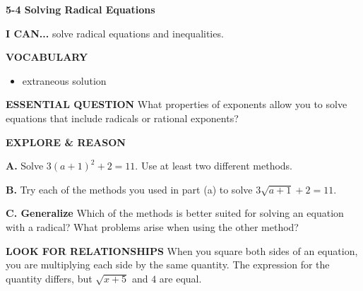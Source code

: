 \documentclass{article}
\newenvironment{lesson-meta}{}{}
\newenvironment{item-analysis}{}{}
\newenvironment{model-discuss}{}{}
\newenvironment{concept-box}{}{}
\begin{document}
\begin{lesson-meta}
\textbf{5-4 Solving Radical Equations}

\textbf{I CAN...} solve radical equations and inequalities.

\textbf{VOCABULARY}
\begin{itemize}
    \item extraneous solution
\end{itemize}

\textbf{ESSENTIAL QUESTION}
What properties of exponents allow you to solve equations that include radicals or rational exponents?
\end{lesson-meta}

\begin{item-analysis}
\end{item-analysis}

\begin{model-discuss}
\textbf{EXPLORE \& REASON}

\textbf{A.} Solve $3(a + 1)^2 + 2 = 11$. Use at least two different methods.

\textbf{B.} Try each of the methods you used in part (a) to solve $3\sqrt{a + 1} + 2 = 11$.

\textbf{C. Generalize} Which of the methods is better suited for solving an equation with a radical? What problems arise when using the other method?
\end{model-discuss}

\begin{concept-box}
\textbf{LOOK FOR RELATIONSHIPS}
When you square both sides of an equation, you are multiplying each side by the same quantity. The expression for the quantity differs, but $\sqrt{x + 5}$ and $4$ are equal.
\end{concept-box}
\end{document}
